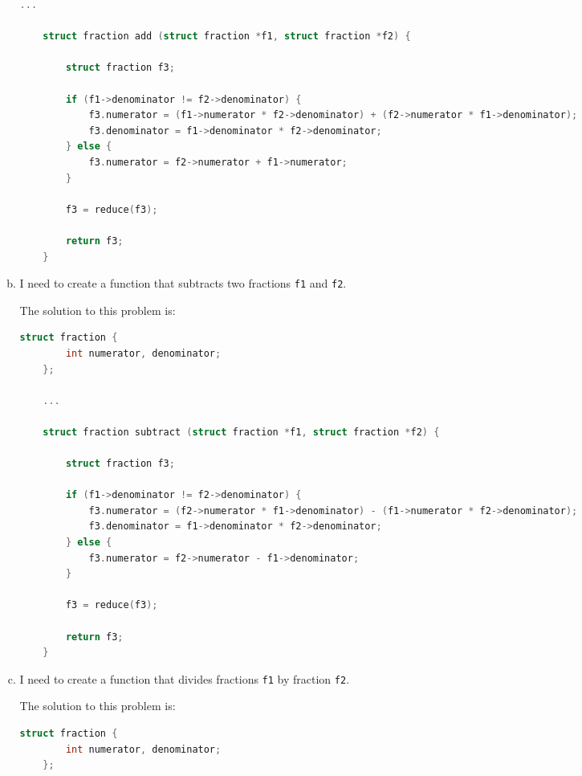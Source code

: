 \documentclass[12pt]{article}
\begin{document}
\begin{enumerate}[1.]
\begin{enumerate}[a)]
\begin{lstlisting}[language=c]
    ...

    struct fraction add (struct fraction *f1, struct fraction *f2) {

        struct fraction f3;

        if (f1->denominator != f2->denominator) {
            f3.numerator = (f1->numerator * f2->denominator) + (f2->numerator * f1->denominator);
            f3.denominator = f1->denominator * f2->denominator;
        } else {
            f3.numerator = f2->numerator + f1->numerator;
        }

        f3 = reduce(f3);

        return f3;
    }
\end{lstlisting}

        \item

        I need to create a function that subtracts two fractions \texttt{f1} and \texttt{f2}.

        \bigskip

        The solution to this problem is:

\begin{lstlisting}[language=c]
    struct fraction {
        int numerator, denominator;
    };

    ...

    struct fraction subtract (struct fraction *f1, struct fraction *f2) {

        struct fraction f3;

        if (f1->denominator != f2->denominator) {
            f3.numerator = (f2->numerator * f1->denominator) - (f1->numerator * f2->denominator);
            f3.denominator = f1->denominator * f2->denominator;
        } else {
            f3.numerator = f2->numerator - f1->denominator;
        }

        f3 = reduce(f3);

        return f3;
    }
\end{lstlisting}

        \item

        I need to create a function that divides fractions \texttt{f1} by fraction \texttt{f2}.

        \bigskip

        The solution to this problem is:

\begin{lstlisting}[language=c]
    struct fraction {
        int numerator, denominator;
    };


\end{lstlisting}
\end{enumerate}
\end{enumerate}
\end{document}
